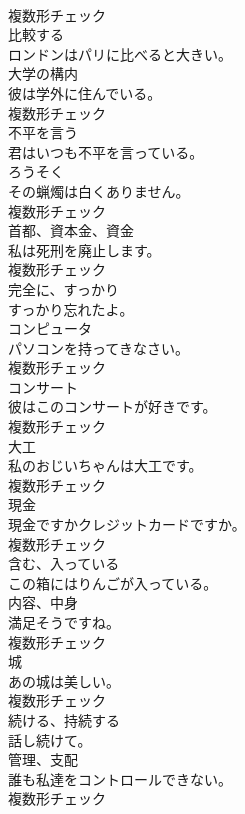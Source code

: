 \documentclass[8pt]{extreport}
\begin{document}
\begin{CJK}{UTF8}{min}
\\	複数形チェック
\\	[動詞]	比較する	
\\	ロンドンはパリに比べると大きい。	
\\	[名詞]	大学の構内	
\\	彼は学外に住んでいる。	
\\	複数形チェック
\\	[動詞]	不平を言う	
\\	君はいつも不平を言っている。	
\\	[名詞]	ろうそく	
\\	その蝋燭は白くありません。	
\\	複数形チェック
\\	[名詞]	首都、資本金、資金	
\\	私は死刑を廃止します。	
\\	複数形チェック
\\	[副詞]	完全に、すっかり	
\\	すっかり忘れたよ。	
\\	[名詞]	コンピュータ	
\\	パソコンを持ってきなさい。	
\\	複数形チェック
\\	[名詞]	コンサート	
\\	彼はこのコンサートが好きです。	
\\	複数形チェック
\\	[名詞]	大工	
\\	私のおじいちゃんは大工です。	
\\	複数形チェック
\\	[名詞]	現金	
\\	現金ですかクレジットカードですか。	
\\	複数形チェック
\\	[動詞]	含む、入っている	
\\	この箱にはりんごが入っている。	
\\	[名詞]	内容、中身	
\\	満足そうですね。	
\\	複数形チェック
\\	[名詞]	城	
\\	あの城は美しい。	
\\	複数形チェック
\\	[動詞]	続ける、持続する	
\\	話し続けて。	
\\	[名詞]	管理、支配	
\\	誰も私達をコントロールできない。	
\\	複数形チェック

\end{CJK}
\end{document}
